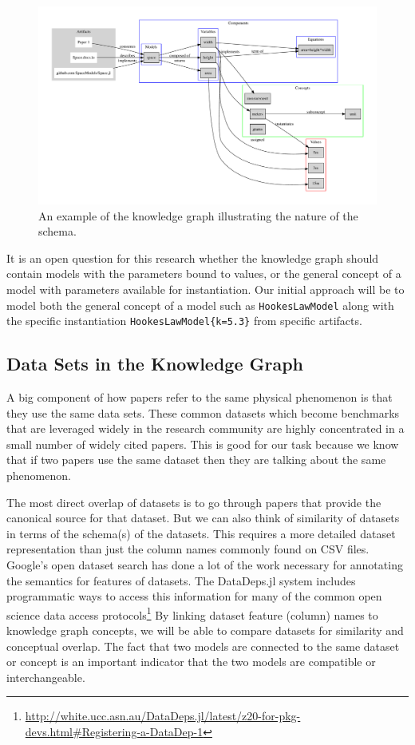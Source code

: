 \documentclass{article}
\newcommand{\jlpkg}[1]{#1.jl}
\begin{document}
\begin{figure}
    \centering
    \includegraphics[width=\textwidth]{schema.pdf}
    \caption{An example of the knowledge graph illustrating the nature of the schema.}
    \label{fig:schema.}
\end{figure}

It is an open question for this research whether the knowledge graph should contain models with the parameters bound to values, or the general concept of a model with parameters available for instantiation. Our initial approach will be to model both the general concept of a model such as \texttt{HookesLawModel} along with the specific instantiation \texttt{HookesLawModel\{k=5.3\}} from specific artifacts.

\subsection{Data Sets in the Knowledge Graph}
A big component of how papers refer to the same physical phenomenon is that they use the same data sets. These common datasets which become benchmarks that are leveraged widely in the research community are highly concentrated in a small number of widely cited papers. This is good for our task because we know that if two papers use the same dataset then they are talking about the same phenomenon. 

The most direct overlap of datasets is to go through papers that provide the canonical source for that dataset. But we can also think of similarity of datasets in terms of the schema(s) of the datasets. This requires a more detailed dataset representation than just the column names commonly found on CSV files. Google's open dataset search has done a lot of the work necessary for annotating the semantics for features of datasets.
The \jlpkg{DataDeps} system includes programmatic ways to access this information for many of the common open science data access protocols\footnote{\url{http://white.ucc.asn.au/DataDeps.jl/latest/z20-for-pkg-devs.html\#Registering-a-DataDep-1}}
By linking dataset feature (column) names to knowledge graph concepts, we will be able to compare datasets for similarity and conceptual overlap. The fact that two models are connected to the same dataset or concept is an important indicator that the two models are compatible or interchangeable.
\end{document}
